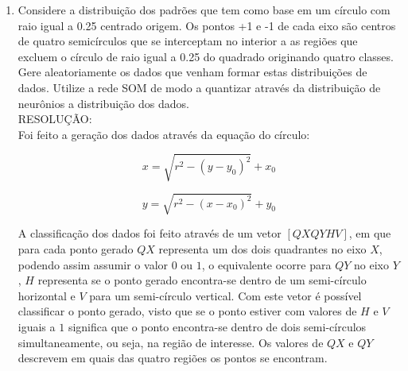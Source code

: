 \documentclass[a4paper,oneside,12pt]{article}
\begin{document}
\begin{enumerate}[1.]
Foram implementados o algoritmo competitivo e o algoritmo SOM, como segue abaixo junto com o resultado:

\begin{figure}[h]
\centering
\texttt{[image: q7.png]}
\caption{Resultado da rede SOM para a espiral.}
\label{fig:q7}
\end{figure}





\item Considere a distribui\c{c}\~ao dos padr\~oes que tem como base em um c\'irculo com raio igual a 0.25 centrado origem. Os pontos +1 e -1 de cada eixo s\~ao centros de quatro semic\'irculos que se interceptam no interior a as regi\~oes que excluem o c\'irculo de raio igual a 0.25 do quadrado originando quatro classes. Gere aleatoriamente os dados que venham formar estas distribui\c{c}\~oes de dados. Utilize a rede SOM de modo a quantizar atrav\'es da distribui\c{c}\~ao de neur\^onios a distribui\c{c}\~ao dos dados. \\

RESOLU\c{C}\~AO: \\

Foi feito a gera\c{c}\~ao dos dados atrav\'es da equa\c{c}\~ao do c\'irculo:

\begin{equation*}
x = \sqrt{r^{2} - (y - y_{0})^{2}} + x_{0}
\end{equation*}

\begin{equation*}
y = \sqrt{r^{2} - (x - x_{0})^{2}} + y_{0}
\end{equation*}

A classifica\c{c}\~ao dos dados foi feito atrav\'es de um vetor $[QX QY H V]$, em que para cada ponto gerado $QX$ representa um dos dois quadrantes no eixo $X$, podendo assim assumir o valor $0$ ou $1$, o equivalente ocorre para $QY$ no eixo $Y$, $H$ representa se o ponto gerado encontra-se dentro de um semi-c\'irculo horizontal e $V$ para um semi-c\'irculo vertical. Com este vetor \'e poss\'ivel classificar o ponto gerado, visto que se o ponto estiver com valores de $H$ e $V$ iguais a $1$ significa que o ponto encontra-se dentro de dois semi-c\'irculos simultaneamente, ou seja, na regi\~ao de interesse. Os valores de $QX$ e $QY$ descrevem em quais das quatro regi\~oes os pontos se encontram.


\end{enumerate}
\end{document}
